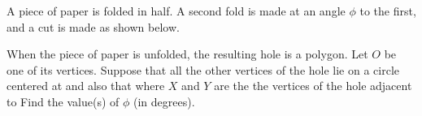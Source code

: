 A piece of paper is folded in half.  A second fold is made at an angle $ \phi$  to the first, and a cut is made as shown below.

When the piece of paper is unfolded, the resulting hole is a polygon.  Let $ O$ be one of its vertices. Suppose that all the other vertices of the hole lie on a circle centered at  and also that  where $ X$ and $ Y$ are the the vertices of the hole adjacent to  Find the value(s) of $ \phi$ (in degrees).